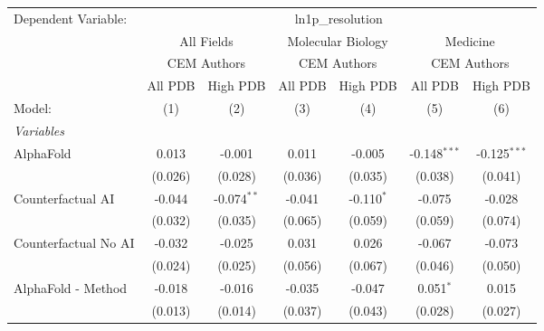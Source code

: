 \begingroup
\centering
\begin{tabular}{lcccccc}
   \tabularnewline \midrule \midrule
   Dependent Variable: & \multicolumn{6}{c}{ln1p\_resolution}\\
 & \multicolumn{2}{c}{All Fields} & \multicolumn{2}{c}{Molecular Biology} & \multicolumn{2}{c}{Medicine} \\
\cmidrule(lr){2-3} \cmidrule(lr){4-5} \cmidrule(lr){6-7}
 & \multicolumn{2}{c}{CEM Authors} & \multicolumn{2}{c}{CEM Authors} & \multicolumn{2}{c}{CEM Authors} \\
\cmidrule(lr){2-3} \cmidrule(lr){4-5} \cmidrule(lr){6-7}
 & \multicolumn{1}{c}{All PDB} & \multicolumn{1}{c}{High PDB} & \multicolumn{1}{c}{All PDB} & \multicolumn{1}{c}{High PDB} & \multicolumn{1}{c}{All PDB} & \multicolumn{1}{c}{High PDB} \\
\cmidrule(lr){2-2} \cmidrule(lr){3-3} \cmidrule(lr){4-4} \cmidrule(lr){5-5} \cmidrule(lr){6-6} \cmidrule(lr){7-7}
   Model:                                                     & (1)     & (2)           & (3)           & (4)          & (5)            & (6)\\  
   \midrule
   \emph{Variables}\\
   AlphaFold                                                  & 0.013   & -0.001        & 0.011         & -0.005       & -0.148$^{***}$ & -0.125$^{***}$\\   
                                                              & (0.026) & (0.028)       & (0.036)       & (0.035)      & (0.038)        & (0.041)\\   
   Counterfactual AI                                          & -0.044  & -0.074$^{**}$ & -0.041        & -0.110$^{*}$ & -0.075         & -0.028\\   
                                                              & (0.032) & (0.035)       & (0.065)       & (0.059)      & (0.059)        & (0.074)\\   
   Counterfactual No AI                                       & -0.032  & -0.025        & 0.031         & 0.026        & -0.067         & -0.073\\   
                                                              & (0.024) & (0.025)       & (0.056)       & (0.067)      & (0.046)        & (0.050)\\   
   AlphaFold - Method                                         & -0.018  & -0.016        & -0.035        & -0.047       & 0.051$^{*}$    & 0.015\\   
                                                              & (0.013) & (0.014)       & (0.037)       & (0.043)      & (0.028)        & (0.027)\\   

\end{tabular}
